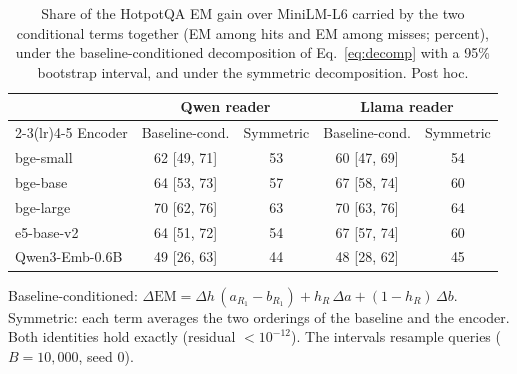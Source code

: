 \begin{table}[t]
\centering
\small
\caption{Share of the HotpotQA EM gain over MiniLM-L6 carried by the two conditional terms together (EM among hits and EM among misses; percent), under the baseline-conditioned decomposition of Eq.~\ref{eq:decomp} with a 95\% bootstrap interval, and under the symmetric decomposition. Post hoc.}
\label{tab:share}
\begin{tabular}{lcccc}
\toprule
 & \multicolumn{2}{c}{Qwen reader} & \multicolumn{2}{c}{Llama reader} \\
\cmidrule(lr){2-3}\cmidrule(lr){4-5}
Encoder & Baseline-cond. & Symmetric & Baseline-cond. & Symmetric \\
\midrule
bge-small & 62 [49, 71] & 53 & 60 [47, 69] & 54 \\
bge-base & 64 [53, 73] & 57 & 67 [58, 74] & 60 \\
bge-large & 70 [62, 76] & 63 & 70 [63, 76] & 64 \\
e5-base-v2 & 64 [51, 72] & 54 & 67 [57, 74] & 60 \\
Qwen3-Emb-0.6B & 49 [26, 63] & 44 & 48 [28, 62] & 45 \\
\bottomrule
\end{tabular}
\par\smallskip\parbox{\linewidth}{\footnotesize Baseline-conditioned: $\Delta\mathrm{EM}=\Delta h\,(a_{R_1}-b_{R_1})+h_R\,\Delta a+(1-h_R)\,\Delta b$. Symmetric: each term averages the two orderings of the baseline and the encoder. Both identities hold exactly (residual $<10^{-12}$). The intervals resample queries ($B=10{,}000$, seed 0).}
\end{table}
